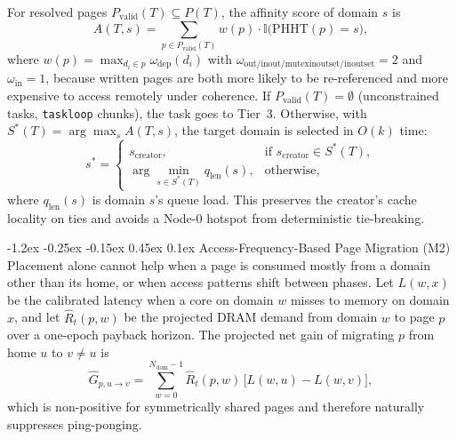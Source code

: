 \documentclass[10pt,twocolumn,letterpaper]{article}
\makeatletter
\renewcommand{\subsection}{\@startsection{subsection}{2}{\z@}%
  {-1.2ex \@plus -0.25ex \@minus -0.15ex}%
  {0.45ex \@plus 0.1ex}%
  {\normalfont\small\itshape}}
\makeatother
\begin{document}
For resolved pages $P_{\mathrm{valid}}(T) \subseteq P(T)$, the affinity score of domain $s$ is
\begin{equation}
A(T,s) = \sum_{p \in P_{\mathrm{valid}}(T)} w(p)\cdot \mathbb{I}\bigl(\mathrm{PHHT}(p) = s\bigr),
\label{eq:affinity}
\end{equation}
where $w(p) = \max_{d_i \in p} \omega_{\mathrm{dep}}(d_i)$ with $\omega_{\mathrm{out/inout/mutexinoutset/inoutset}} = 2$ and $\omega_{\mathrm{in}} = 1$, because written pages are both more likely to be re-referenced and more expensive to access remotely under coherence. If $P_{\mathrm{valid}}(T) = \emptyset$ (unconstrained tasks, \texttt{taskloop} chunks), the task goes to Tier~3. Otherwise, with $S^*(T) = \arg\max_s A(T,s)$, the target domain is selected in $O(k)$ time:
\begin{equation}
s^* = \begin{cases}
s_{\mathrm{creator}}, & \text{if } s_{\mathrm{creator}} \in S^*(T), \\
\arg\min_{s \in S^*(T)} q_{\mathrm{len}}(s), & \text{otherwise,}
\end{cases}
\label{eq:target}
\end{equation}
where $q_{\mathrm{len}}(s)$ is domain $s$'s queue load. This preserves the creator's cache locality on ties and avoids a Node-0 hotspot from deterministic tie-breaking.

\subsection{Access-Frequency-Based Page Migration (M2)}
Placement alone cannot help when a page is consumed mostly from a domain other than its home, or when access patterns shift between phases. Let $L(w,x)$ be the calibrated latency when a core on domain $w$ misses to memory on domain $x$, and let $\widehat{R}_t(p,w)$ be the projected DRAM demand from domain $w$ to page $p$ over a one-epoch payback horizon. The projected net gain of migrating $p$ from home $u$ to $v \ne u$ is
\begin{equation}
\widehat{G}_{p,u\to v} = \sum_{w=0}^{N_{\mathrm{dom}}-1} \widehat{R}_t(p,w)\,\bigl[L(w,u) - L(w,v)\bigr],
\label{eq:benefit}
\end{equation}
which is non-positive for symmetrically shared pages and therefore naturally suppresses ping-ponging.
\end{document}
